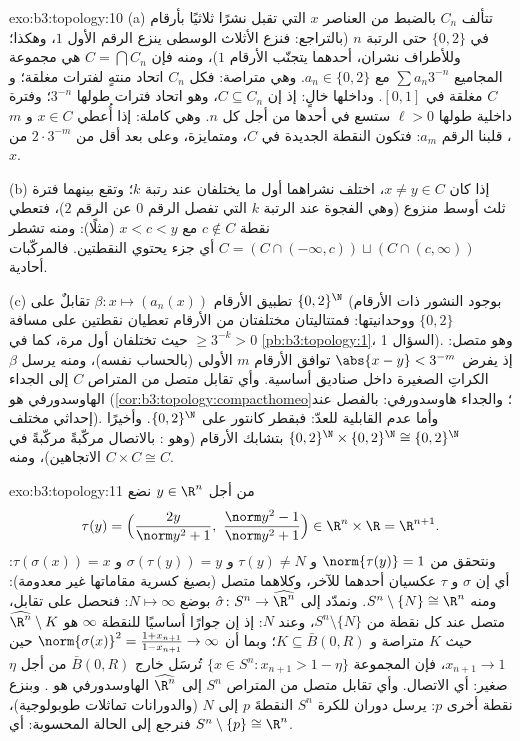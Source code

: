 \begin{solution}{exo:b3:topology:10}
(a) تتألف $C_n$ بالضبط من العناصر $x$ التي تقبل نشرًا ثلاثيًا
بأرقام في $\{0, 2\}$ حتى الرتبة $n$ (بالتراجع: فنزع الأثلاث
الوسطى ينزع الرقم الأول $1$، وهكذا؛ وللأطراف نشران، أحدهما
يتجنّب الأرقام $1$)، ومنه فإن $C = \bigcap C_n$ هي مجموعة المجاميع
$\sum a_n3^{-n}$ مع $a_n \in \{0,2\}$. وهي متراصة: فكل $C_n$ اتحاد منتهٍ
لفترات مغلقة؛ و $C$ مغلقة في $[0,1]$. وداخلها خالٍ: إذ إن
$C \subseteq C_n$، وهو اتحاد فترات طولها $3^{-n}$؛ وفترة داخلية طولها
$\ell > 0$ ستسع في أحدها من أجل كل $n$. وهي كاملة: إذا أُعطي
$x \in C$ و $m$، قلبنا الرقم $a_m$: فتكون النقطة الجديدة في
$C$، ومتمايزة، وعلى بعد أقل من $2\cdot3^{-m}$ من $x$.

(b) إذا كان $x \neq y \in C$، اختلف نشراهما أول ما يختلفان عند
رتبة $k$؛ وتقع بينهما فترة ثلث أوسط منزوع (وهي الفجوة عند
الرتبة $k$ التي تفصل الرقم $0$ عن الرقم $2$)، فتعطي نقطة
$c \notin C$ مع $x < c < y$ (مثلًا): ومنه تشطر $C =
(C \cap (-\infty, c)) \sqcup (C \cap (c, \infty))$ أي جزء
يحتوي النقطتين. فالمركّبات أحادية.

(c) تطبيق الأرقام $\beta\colon x \mapsto (a_n(x))$ تقابلٌ على $\{0,2\}^\N$ (بوجود
النشور ذات الأرقام $\{0,2\}$ ووحدانيتها: فمتتاليتان مختلفتان من
الأرقام تعطيان نقطتين على مسافة $\geq 3^{-k} > 0$ حيث تختلفان أول مرة،
كما في \cref{pb:b3:topology:1}، السؤال 1). وهو متصل: إذ يفرض $\abs{x - y} < 3^{-m}$ توافق
الأرقام $m$ الأولى (بالحساب نفسه)، ومنه يرسل $\beta$ الكراتِ
الصغيرة داخل صناديق أساسية. وأي تقابل متصل من المتراص $C$ إلى
الجداء الهاوسدورفي هو  (\cref{cor:b3:topology:compacthomeo}؛ والجداء
هاوسدورفي: بالفصل عند إحداثي مختلف). وأما عدم القابلية للعدّ:
فبقطر كانتور على $\{0,2\}^\N$. وأخيرًا $\{0,2\}^\N \times
\{0,2\}^\N \cong \{0,2\}^\N$ بتشابك الأرقام
(وهو : بالاتصال مركّبةً مركّبةً في الاتجاهين)،
ومنه $C
\times C \cong C$.
\end{solution}

\begin{solution}{exo:b3:topology:11}
من أجل $y \in \R^n$ نضع
\[
\tau(y) = \Bigl(\frac{2y}{\norm y^2 + 1},\ \frac{\norm y^2 -
1}{\norm y^2 + 1}\Bigr) \in \R^n\times\R = \R^{n+1}.
\]
ونتحقق من $\norm{\tau(y)} = 1$ و $\tau(y) \neq N$ و $\sigma(\tau(y)) = y$ و $\tau(\sigma(x)) = x$: أي
إن $\sigma$ و $\tau$ عكسيان أحدهما للآخر، وكلاهما متصل (بصيغ
كسرية مقاماتها غير معدومة): ومنه $S^n\setminus\{N\} \cong
\R^n$. ونمدّد إلى $\hat\sigma \colon S^n \to \widehat{\R^n}$
بوضع $N \mapsto \infty$: فنحصل على تقابل، متصل عند كل نقطة من $S^n\setminus\{N\}$،
وعند $N$: إذ إن جوارًا أساسيًا للنقطة $\infty$ هو $\widehat{\R^n}\setminus K$ حيث
$K$ متراصة و $K
\subseteq \bar B(0, R)$؛ وبما أن $\norm{\sigma(x)}^2 = \frac{1 +
x_{n+1}}{1 - x_{n+1}} \to \infty$ حين $x_{n+1} \to 1$،
فإن المجموعة $\{x \in S^n : x_{n+1} > 1 - \eta\}$ تُرسَل خارج $\bar B(0,R)$ من أجل $\eta$
صغير: أي الاتصال. وأي تقابل متصل من المتراص $S^n$ إلى
$\widehat{\R^n}$ الهاوسدورفي هو . وبنزع نقطة
أخرى $p$: يرسل دوران للكرة $S^n$ النقطةَ $p$ إلى $N$ (والدورانات
تماثلات طوبولوجية)، فنرجع إلى الحالة المحسوبة: أي $S^n \setminus \{p\} \cong \R^n$.
\end{solution}

